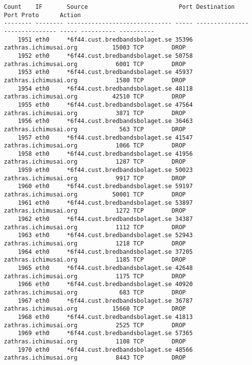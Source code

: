 \documentclass[english,twoside,openright,a4paper,12pt]{article}
\begin{document}
\tiny \begin{verbatim}
Count    IF       Source                          Port Destination                     Port Proto      Action    
-------- -------- ------------------------------ ----- ------------------------------ ----- ---------- ----------
    1951 eth0     *6f44.cust.bredbandsbolaget.se 35396 zathras.ichimusai.org          15003 TCP        DROP      
    1952 eth0     *6f44.cust.bredbandsbolaget.se 50758 zathras.ichimusai.org           6001 TCP        DROP      
    1953 eth0     *6f44.cust.bredbandsbolaget.se 45937 zathras.ichimusai.org           1580 TCP        DROP      
    1954 eth0     *6f44.cust.bredbandsbolaget.se 48118 zathras.ichimusai.org          42510 TCP        DROP      
    1955 eth0     *6f44.cust.bredbandsbolaget.se 47564 zathras.ichimusai.org           3871 TCP        DROP      
    1956 eth0     *6f44.cust.bredbandsbolaget.se 36463 zathras.ichimusai.org            563 TCP        DROP      
    1957 eth0     *6f44.cust.bredbandsbolaget.se 41547 zathras.ichimusai.org           1066 TCP        DROP      
    1958 eth0     *6f44.cust.bredbandsbolaget.se 41956 zathras.ichimusai.org           1287 TCP        DROP      
    1959 eth0     *6f44.cust.bredbandsbolaget.se 50023 zathras.ichimusai.org           9917 TCP        DROP      
    1960 eth0     *6f44.cust.bredbandsbolaget.se 59197 zathras.ichimusai.org          50001 TCP        DROP      
    1961 eth0     *6f44.cust.bredbandsbolaget.se 53897 zathras.ichimusai.org           1272 TCP        DROP      
    1962 eth0     *6f44.cust.bredbandsbolaget.se 34387 zathras.ichimusai.org           1112 TCP        DROP      
    1963 eth0     *6f44.cust.bredbandsbolaget.se 52943 zathras.ichimusai.org           1218 TCP        DROP      
    1964 eth0     *6f44.cust.bredbandsbolaget.se 37205 zathras.ichimusai.org           1185 TCP        DROP      
    1965 eth0     *6f44.cust.bredbandsbolaget.se 42648 zathras.ichimusai.org           1175 TCP        DROP      
    1966 eth0     *6f44.cust.bredbandsbolaget.se 40920 zathras.ichimusai.org            683 TCP        DROP      
    1967 eth0     *6f44.cust.bredbandsbolaget.se 36787 zathras.ichimusai.org          15660 TCP        DROP      
    1968 eth0     *6f44.cust.bredbandsbolaget.se 41813 zathras.ichimusai.org           2525 TCP        DROP      
    1969 eth0     *6f44.cust.bredbandsbolaget.se 57365 zathras.ichimusai.org           1108 TCP        DROP      
    1970 eth0     *6f44.cust.bredbandsbolaget.se 48566 zathras.ichimusai.org           8443 TCP        DROP      
\end{verbatim} \normalsize
\end{document}
